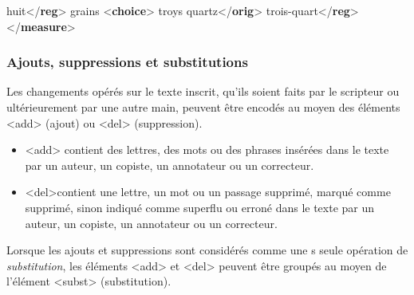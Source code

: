 \documentclass[]{beamer}\makeatletter
\begin{document}
\begin{frame}[fragile]
\begin{exampleblock}{}
\hspace*{6pt}huit{\color{blue1}</\textbf{reg}>}\mbox{}\newline 
{}\mbox{}\newline 
 grains {\color{blue1}<\textbf{choice}>}\mbox{}\newline 
\hspace*{6pt}troys quartz{\color{blue1}</\textbf{orig}>}\mbox{}\newline 
\hspace*{6pt}trois-quart{\color{blue1}</\textbf{reg}>}\mbox{}\newline 
{}\mbox{}\newline 
{\color{blue1}</\textbf{measure}>}
\end{exampleblock}
\par\egroup
  
\end{frame}

\begin{frame}
\frametitle{Ajouts, suppressions et substitutions}\par
Les changements opérés sur le texte inscrit, qu’ils soient faits par      le scripteur ou ultérieurement par une autre main, peuvent être      encodés au moyen des éléments {\color{blue2}<add>} (ajout) ou {\color{blue2}<del>}      (suppression). \begin{itemize}

\item {\color{blue2}<add>} contient des lettres, des mots ou des phrases        insérées dans le texte par un auteur, un copiste, un annotateur ou        un correcteur.
\item {\color{blue2}<del>}contient une lettre, un mot ou un passage        supprimé, marqué comme supprimé, sinon indiqué comme superflu ou        erroné dans le texte par un auteur, un copiste, un annotateur ou        un correcteur.
\end{itemize}  Lorsque les ajouts et suppressions sont considérés comme une s     seule opération de \emph{substitution}, les éléments       {\color{blue2}<add>} et {\color{blue2}<del>} peuvent être groupés au moyen de      l’élément {\color{blue2}<subst>} (substitution). 
\end{frame}
\end{document}
